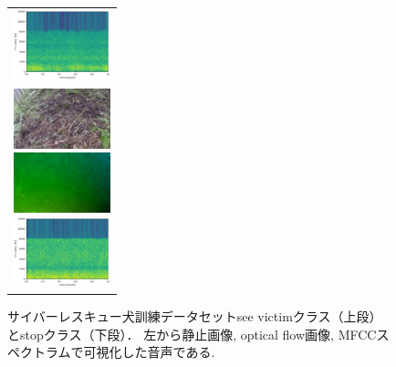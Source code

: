 \documentclass[MIRU,submit,english]{miru2019e}
\begin{document}
\begin{figure}[tb]
\begin{tabular}{l}
      \begin{minipage}{0.32\hsize}
        \begin{center}
          \includegraphics[clip, width=2.8cm]{./Figures/sound_seevictim.eps}
        \end{center}
      \end{minipage}
\\  %
      \begin{minipage}{0.32\hsize}
        \begin{center}
          \includegraphics[clip, width=2.8cm]{./Figures/still_stop1-3.eps}
        \end{center}
      \end{minipage}
      \begin{minipage}{0.32\hsize}
        \begin{center}
          \includegraphics[clip, width=2.8cm]{./Figures/optic_stop1-3.eps}
        \end{center}
      \end{minipage}
      \begin{minipage}{0.32\hsize}
        \begin{center}
          \includegraphics[clip, width=2.8cm]{./Figures/sound_stop2.eps}
        \end{center}
      \end{minipage}
    \end{tabular}
    \caption{サイバーレスキュー犬訓練データセットsee victimクラス（上段）とstopクラス（下段）． 左から静止画像, optical flow画像, MFCCスペクトラムで可視化した音声である.}
    \label{dataset}
\end{figure}
\end{document}
